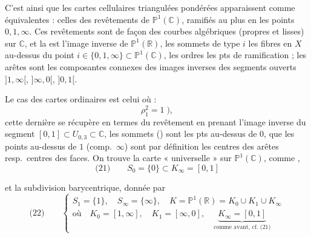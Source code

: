 \documentclass[11pt,a4paper]{article}
\begin{document}
C'est ainsi que  les cartes cellulaires triangulées pondérées
apparaissent comme équivalentes  : celles des 
revêtements  de \struck{\ill{}} $\mathbb{P}^1(\mathbb{C})$, ramifiés
au plus en les points $0, 1, \infty$. Ces revêtements sont de façon
 \ill{} des courbes algébriques (propres et lisses) sur
$\mathbb{C}$, et la   est l'image inverse de
 $\mathbb{P}^1(\mathbb{R})$, les sommets de type $i$ 
les fibres en $X$ au-dessus du point $i \in \{0, 1, \infty\} \subset
\mathbb{P}^1(\mathbb{C})$, les ordres  les pts de ramification ;
les arêtes sont les composantes connexes des images inverses des segments ouverts
$]1, \infty[$, $]\infty, 0[$, $]0, 1[$. 

Le cas des cartes ordinaires est celui où \ill{} :
\[
  \rho_1^2 = 1 \;) ,
\]
cette dernière se récupère en termes du revêtement en prenant l'image inverse du
segment $[0, 1] \subset U_{0,3} \subset \mathbb{C}$, les sommets
() sont les pts au-dessus de $0$,  que les
points au-dessus de $1$ (comp.\ $\infty$) sont par définition les centres des
arêtes resp.\ centres des faces. On trouve la carte 
« universelle »  sur $\mathbb{P}^1(\mathbb{C})$, comme
,
\[
  \text{(21)} \qquad S_0 = \{0\} \subset K_\infty = [0, 1]
\]

et la subdivision barycentrique, donnée par
\[
  \text{(22)} \qquad
  \left\{
  \begin{array}{l}
    S_1 = \{1\}, \quad S_\infty = \{\infty\}, \quad
    K = \mathbb{P}^1(\mathbb{R}) = K_0 \cup K_1 \cup K_\infty \\
    \text{où} \quad K_0 = [1, \infty], \quad K_1 = [\infty, 0], \quad
    \underbrace{K_\infty = [0, 1]}_{\text{comme avant, cf.\ (21)}}
  \end{array}
  \right.
\]
\end{document}
